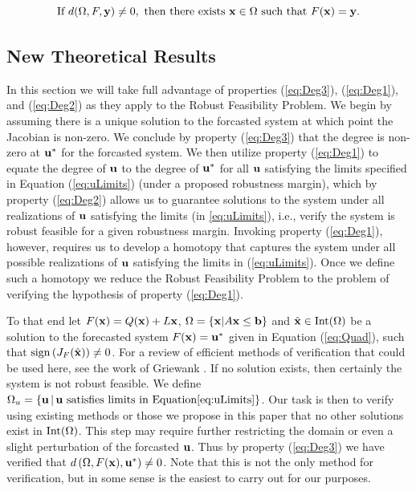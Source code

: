 \begin{equation}\label{eq:Deg2}
\text{If }d(\Omega,F,\mathbf{y})\neq 0,\text{ then there exists }\mathbf{x}\in\Omega\text{ such that }F(\mathbf{x})=\mathbf{y}. 
\end{equation}

\subsection{New Theoretical Results}
In this section we will take full advantage of properties (\ref{eq:Deg3}), (\ref{eq:Deg1}), and (\ref{eq:Deg2}) as they apply to the Robust Feasibility Problem.
We begin by assuming there is a unique solution to the forcasted system at which point the Jacobian is non-zero.
We conclude by property (\ref{eq:Deg3}) that the degree is non-zero at $\mathbf{u}^*$ for the forcasted system. 
We then utilize property (\ref{eq:Deg1}) to equate the degree of $\mathbf{u}$ to the degree of $\mathbf{u}^*$ for all $\mathbf{u}$ satisfying the limits specified in Equation (\ref{eq:uLimits}) (under a proposed robustness margin), which by property (\ref{eq:Deg2}) allows us to guarantee solutions to the system under all realizations of $\mathbf{u}$ satisfying the limits (in \ref{eq:uLimits}), i.e., verify the system is robust feasible for a given robustness margin.
Invoking property (\ref{eq:Deg1}), however, requires us to develop a homotopy that captures the system under all possible realizations of $\mathbf{u}$ satisfying the limits in (\ref{eq:uLimits}).
Once we define such a homotopy we reduce the Robust Feasibility Problem to the problem of verifying the hypothesis of property (\ref{eq:Deg1}). 

\medskip
To that end let $F(\mathbf{x})=Q(\mathbf{x})+L\mathbf{x}$, $\Omega=\{\mathbf{x}| A\mathbf{x} \leq \mathbf{b}\}$ and $\hat{\mathbf{x}}\in \operatorname{Int}(\Omega)$ be a solution to the forecasted system $F(\mathbf{x})=\mathbf{u}^*$ given in Equation (\ref{eq:Quad}), such that $\operatorname{sign}\left(J_{F}(\hat{\mathbf{x}})\right) \neq 0$.
For a review of efficient methods of verification that could be used here, see the work of Griewank \cite{GRIEWANK2014}. 
If no solution exists, then certainly the system is not robust feasible.
We define $\Omega_u=\{\mathbf{u} \,|\,\mathbf{u} \text{ satisfies limits in Equation} \ref{eq:uLimits}\}$.
Our task is then to verify using existing methods or those we propose in this paper that no other solutions exist in $\operatorname{Int}(\Omega)$.
This step may require further restricting the domain or even a slight perturbation of the forcasted $\mathbf{u}$. 
Thus by property (\ref{eq:Deg3}) we have verified that $d\left(\Omega, F(\mathbf{x}), \mathbf{u}^*\right)\neq 0$. 
Note that this is not the only method for verification, but in some sense is the easiest to carry out for our purposes. 

